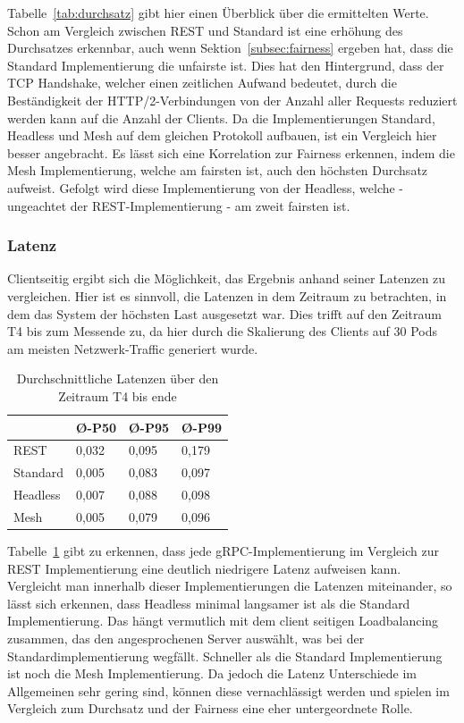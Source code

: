 Tabelle~\ref{tab:durchsatz} gibt hier einen Überblick über die ermittelten Werte.
Schon am Vergleich zwischen REST und Standard ist eine erhöhung des Durchsatzes erkennbar, auch wenn Sektion~\ref{subsec:fairness} ergeben hat, dass die Standard Implementierung die unfairste ist.
Dies hat den Hintergrund, dass der TCP Handshake, welcher einen zeitlichen Aufwand bedeutet, durch die Beständigkeit der HTTP/2-Verbindungen von der Anzahl aller Requests reduziert werden kann auf die Anzahl der Clients.
Da die Implementierungen Standard, Headless und Mesh auf dem gleichen Protokoll aufbauen, ist ein Vergleich hier besser angebracht.
Es lässt sich eine Korrelation zur Fairness erkennen, indem die Mesh Implementierung, welche am fairsten ist, auch den höchsten Durchsatz aufweist.
Gefolgt wird diese Implementierung von der Headless, welche - ungeachtet der REST-Implementierung - am zweit fairsten ist.

\subsubsection{Latenz}
Clientseitig ergibt sich die Möglichkeit, das Ergebnis anhand seiner Latenzen zu vergleichen.
Hier ist es sinnvoll, die Latenzen in dem Zeitraum zu betrachten, in dem das System der höchsten Last ausgesetzt war.
Dies trifft auf den Zeitraum T4 bis zum Messende zu, da hier durch die Skalierung des Clients auf 30 Pods am meisten Netzwerk-Traffic generiert wurde.

\begin{table}[H]
    \centering
    \begin{tabular}{|l|l|l|l|}
        \hline
        & Ø-P50 & Ø-P95 & Ø-P99 \\ \hline
        REST     & 0,032 & 0,095 & 0,179 \\ \hline
        Standard & 0,005 & 0,083 & 0,097 \\ \hline
        Headless & 0,007 & 0,088 & 0,098 \\ \hline
        Mesh     & 0,005 & 0,079 & 0,096 \\ \hline
    \end{tabular}
    \caption{Durchschnittliche Latenzen über den Zeitraum T4 bis ende}
    \label{tab:latenz}
\end{table}

Tabelle~\ref{tab:latenz} gibt zu erkennen, dass jede gRPC-Implementierung im Vergleich zur REST Implementierung eine deutlich niedrigere Latenz aufweisen kann.
Vergleicht man innerhalb dieser Implementierungen die Latenzen miteinander, so lässt sich erkennen, dass Headless minimal langsamer ist als die Standard Implementierung.
Das hängt vermutlich mit dem client seitigen Loadbalancing zusammen, das den angesprochenen Server auswählt, was bei der Standardimplementierung wegfällt.
Schneller als die Standard Implementierung ist noch die Mesh Implementierung.
Da jedoch die Latenz Unterschiede im Allgemeinen sehr gering sind, können diese vernachlässigt werden und spielen im Vergleich zum Durchsatz und der Fairness eine eher untergeordnete Rolle.

